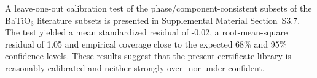 \documentclass[prb,twocolumn,superscriptaddress,amsmath,amssymb,longbibliography]{revtex4-2}
\begin{document}
A leave-one-out calibration test of the phase/component-consistent subsets of the BaTiO$_3$ literature subsets is presented in Supplemental Material Section~S3.7. The test yielded a mean standardized residual of -0.02, a root-mean-square residual of 1.05 and empirical coverage close to the expected 68\% and 95\% confidence levels. These results suggest that the present certificate library is reasonably calibrated and neither strongly over- nor under-confident.







\end{document}
